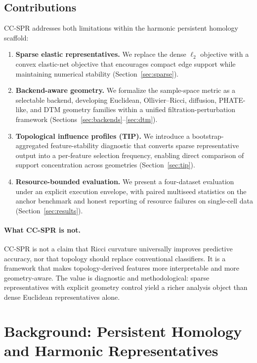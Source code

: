 \documentclass[11pt]{article}
\begin{document}
\subsection{Contributions}

CC-SPR addresses both limitations within the harmonic persistent homology scaffold:
\begin{enumerate}[leftmargin=1.5em]
\item \textbf{Sparse elastic representatives.} We replace the dense $\ell_2$ objective with a convex elastic-net objective that encourages compact edge support while maintaining numerical stability (Section~\ref{sec:sparse}).
\item \textbf{Backend-aware geometry.} We formalize the sample-space metric as a selectable backend, developing Euclidean, Ollivier--Ricci, diffusion, PHATE-like, and DTM geometry families within a unified filtration-perturbation framework (Sections~\ref{sec:backends}--\ref{sec:dtm}).
\item \textbf{Topological influence profiles (TIP).} We introduce a bootstrap-aggregated feature-stability diagnostic that converts sparse representative output into a per-feature selection frequency, enabling direct comparison of support concentration across geometries (Section~\ref{sec:tip}).
\item \textbf{Resource-bounded evaluation.} We present a four-dataset evaluation under an explicit execution envelope, with paired multiseed statistics on the anchor benchmark and honest reporting of resource failures on single-cell data (Section~\ref{sec:results}).
\end{enumerate}

\paragraph{What CC-SPR is not.}
CC-SPR is not a claim that Ricci curvature universally improves predictive accuracy, nor that topology should replace conventional classifiers.
It is a framework that makes topology-derived features more interpretable and more geometry-aware.
The value is diagnostic and methodological: sparse representatives with explicit geometry control yield a richer analysis object than dense Euclidean representatives alone.

\section{Background: Persistent Homology and Harmonic Representatives}
\label{sec:background}
\end{document}

